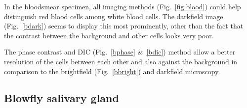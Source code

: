 In the bloodsmear specimen, all imaging methods (Fig.~\ref{fig:blood}) could help distinguish red blood cells among white blood cells. 
The darkfield image (Fig.~\ref{bdark}) seems to display this most prominently, other than the fact that the contrast between the background and other cells looks very poor. 

The phase contrast and DIC (Fig.~\ref{bphase} \&~\ref{bdic}) method allow a better resolution of the cells between each other and also against the background in comparison to the brightfield (Fig.~\ref{bbright}) and darkfield microscopy. 

\subsection{Blowfly salivary gland}

